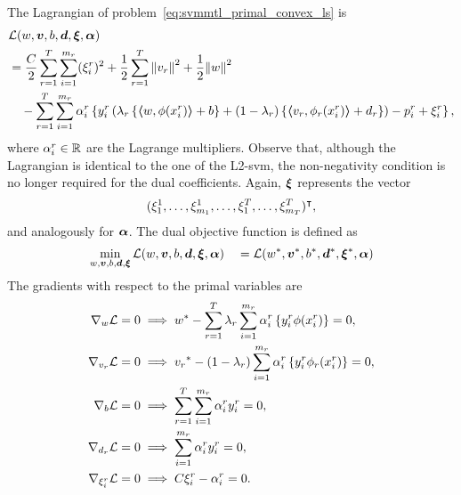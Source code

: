 The Lagrangian of problem~\eqref{eq:svmmtl_primal_convex_ls} is
\begin{equation}\label{eq:svmmtl_lagrangian_convex_ls}
    \begin{aligned}
        & \lagr({w}, \fv{v}, b, \fv{d}, \fv{\xi}, \fv{\alpha}) \\
        &=  \frac{C}{2} \sum_{r= 1}^T \sum_{i=1}^{m_r} ({\xi_{i}^r})^2 + \frac{1}{2} \sum_{r= 1}^T{\norm{{v}_r}^2} + \frac{1}{2} {\norm{{w}}}^2 \\
        &\quad -  \sum_{r= 1}^T \sum_{i=1}^{m_r} \alpha_i^r \left\lbrace y_{i}^r  \left(\lambda_r \left\lbrace \dotp{w}{\phi(x_{i}^r)} + b  \right\rbrace + (1 - \lambda_r) \left\lbrace \dotp{{v}_r}{\phi_r(x_{i}^r)} + d_r \right\rbrace  \right) - p_{i}^r + \xi_{i}^r  \right\rbrace ,
    \end{aligned}
\end{equation}
where $\alpha_i^r \in \mathbb{R}$ are the Lagrange multipliers. Observe that, although the Lagrangian is identical to the one of the L2-\acrshort{svm}, the non-negativity condition is no longer required for the dual coefficients.  Again, $\bm{\xi}$ represents the vector $$(\xi_1^1, \ldots, \xi_{m_1}^1, \ldots, \xi_1^T, \ldots, \xi_{m_T}^T)^\intercal,$$ and analogously for $\bm{\alpha}$. The dual objective function is defined as 
\begin{equation}\nonumber
    \begin{aligned}
          \min_{{w}, \bm{v}, b, \bm{d}, \bm{\xi}} \mathcal{L}({w}, \bm{v}, b, \bm{d}, \bm{\xi}, \bm{\alpha})
         \quad = \mathcal{L}({{w}}^*, {\bm{v}}^*, {b}^*, {\bm{d}}^*, {\bm{\xi}}^*, \bm{\alpha})
    \end{aligned}    
\end{equation}
The gradients with respect to the primal variables are
\begin{align}
    \grad_{{w}} \lagr = 0  &\implies \optim{{w}} - \sum_{r= 1}^\ntasks \lambda_r \sum_{i=1}^{m_r} {\alpha_i^r} \left\lbrace y_i^r \phi(x_i^r) \right\rbrace = 0 , \label{eq:common_repr_conv_ls} \\
    \grad_{{v}_r} \lagr = 0 &\implies \optim{{v}_r} - (1 - \lambda_r) \sum_{i=1}^{m_r} {\alpha_i^r} \left\lbrace y_i^r \phi_r(x_i^r) \right\rbrace = 0 , \label{eq:specific_repr_conv_ls} \\
    \grad_{b} \lagr = 0  &\implies \sum_{r= 1}^T \sum_{i=1}^{m_r} {\alpha_i^r} y_i^r = 0 , \label{eq:specific_eqconstr_conv_ls}  \\
    \grad_{{d}_r} \lagr = 0 &\implies \sum_{i=1}^{m_r} {\alpha_i^r} y_i^r = 0 , \label{eq:common_eqconstr_conv_ls} \\
    \grad_{\xi_i^r} \lagr = 0 &\implies C \xi_i^r - {\alpha_i^r} = 0 . \label{eq:xi_feas_conv_ls}
\end{align}

